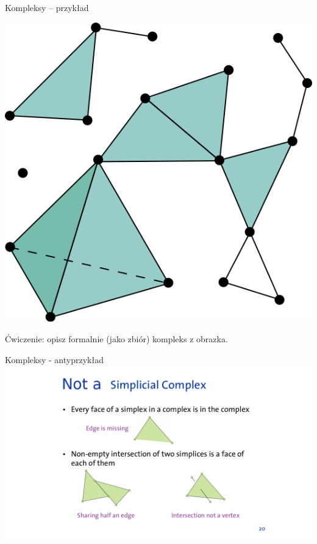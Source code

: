 \documentclass{beamer}
\begin{document}
\begin{frame}{Kompleksy -- przykład}

\begin{center}
\includegraphics[scale = 0.35]{Kompleks.png}
\end{center}

Ćwiczenie: opisz formalnie (jako zbiór) kompleks z obrazka.

\end{frame}

\begin{frame}{Kompleksy - antyprzykład}
\hspace*{-2cm}
\includegraphics[scale=1.43]{NieKompleks.png}
\end{frame}
\end{document}
